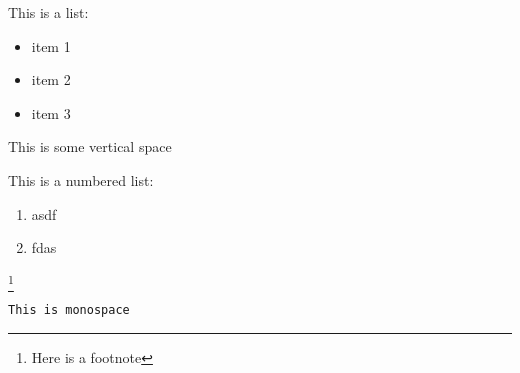 This is a list:
\begin{itemize}
    \item item 1
    \item item 2
    \item item 3
\end{itemize}

This is some vertical space
\vspace{2cm}

This is a numbered list:
\begin{enumerate}
  \item asdf
  \item fdas
\end{enumerate}

\footnote{Here is a footnote}

\texttt{This is monospace}
\newline
\newpage